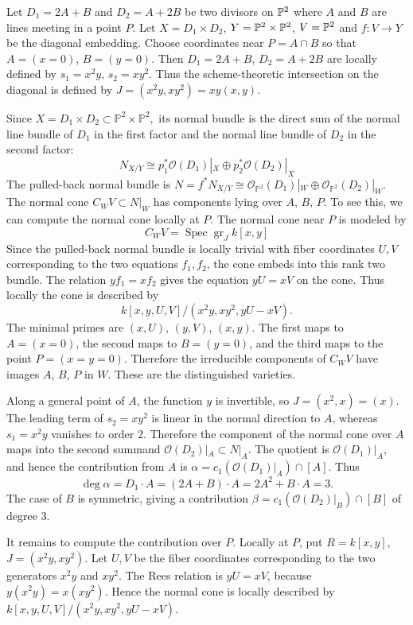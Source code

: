 \documentclass[12pt]{article}
\begin{document}
\begin{example}
    Let $D_1 = 2A + B$ and $D_2 = A + 2B$ be two divisors on $\P^2$ where $A$ and $B$ are lines meeting in a point $P$. Let $X = D_1\times D_2$, $Y = \P^2\times \P^2$, $V = \P^2$ and $f:V\to Y$ be the diagonal embedding. Choose coordinates near \(P=A\cap B\) so that $A=(x=0)$, $B=(y=0)$. Then $D_1=2A+B$, $D_2=A+2B$ are locally defined by $s_1=x^2y$, $s_2=xy^2$. Thus the scheme-theoretic intersection on the diagonal is defined by $J=(x^2y,xy^2)=xy(x,y)$.

Since $X=D_1\times D_2\subset \mathbb P^2\times \mathbb P^2,$ its normal bundle is the direct sum of the normal line bundle of $D_1$ in the first factor and the normal line bundle of $D_2$ in the second factor:
\[
N_{X/Y}
\cong
p_1^*\mathcal O(D_1)|_X
\oplus
p_2^*\mathcal O(D_2)|_X\] The pulled-back normal bundle is $N=f^*N_{X/Y}
\cong
\mathcal O_{\mathbb P^2}(D_1)|_W
\oplus
\mathcal O_{\mathbb P^2}(D_2)|_W$. The normal cone $C_WV\subset N|_W$ has components lying over $A$, $B$, $P$. To see this, we can compute the normal cone locally at $P$.
The normal cone near $P$ is modeled by \[C_WV=\operatorname{Spec}\operatorname{gr}_J k[x,y]\] Since the pulled-back normal bundle is locally trivial with fiber coordinates $U,V$ corresponding to the two equations $f_1,f_2$, the cone embeds into this rank two bundle. The relation $yf_1=xf_2$ gives the equation $yU=xV$ on the cone. Thus locally the cone is described by
$$k[x,y,U,V]/(x^2y,xy^2,yU-xV).$$
The minimal primes are $(x,U)$, $(y,V)$, $(x,y)$. The first maps to $A=(x=0)$, the second maps to $B=(y=0)$, and the third maps to the point $P=(x=y=0)$. Therefore the irreducible components of $C_WV$ have images $A$, $B$, $P$ in $W$. These are the distinguished varieties.

Along a general point of $A$, the function $y$ is invertible, so $J=(x^2,x)=(x)$. The leading term of $s_2=xy^2$ is linear in the normal direction to $A$, whereas $s_1=x^2y$ vanishes to order $2$. Therefore the component of the normal cone over $A$ maps into the second summand $\mathcal O(D_2)|_A\subset N|_A$. The quotient is $\mathcal O(D_1)|_A$, and hence the contribution from $A$ is $\alpha= c_1(\mathcal O(D_1)|_A)\cap [A]$.  Thus
$$\deg\alpha = D_1\cdot A = (2A+B)\cdot A = 2A^2+B\cdot A = 3.$$ The case of $B$ is symmetric, giving a contribution $\beta = c_1(\mathcal O(D_2)|_B)\cap [B]$ of degree $3$.

It remains to compute the contribution over $P$. Locally at $P$, put $R=k[x,y]$, $J=(x^2y,xy^2)$. Let $U,V$ be the fiber coordinates corresponding to the two generators $x^2y$ and $xy^2$. The Rees relation is $yU=xV$, because $y(x^2y)=x(xy^2)$. Hence the normal cone is locally described by $k[x,y,U,V]/(x^2y,xy^2,yU-xV)$.




\end{example}
\end{document}
